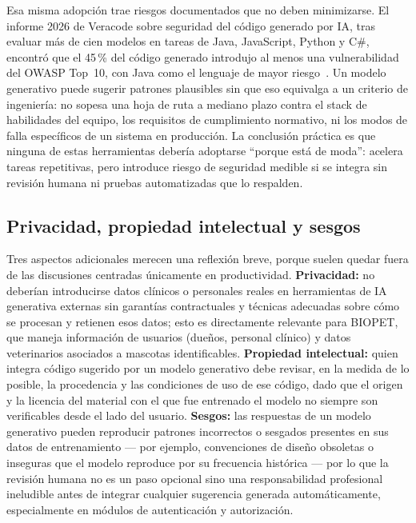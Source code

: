 Esa misma adopci\'on trae riesgos documentados que no deben minimizarse. El
informe 2026 de Veracode sobre seguridad del c\'odigo generado por IA, tras
evaluar m\'as de cien modelos en tareas de Java, JavaScript, Python y C\#,
encontr\'o que el 45\,\% del c\'odigo generado introdujo al menos una
vulnerabilidad del OWASP Top~10, con Java como el lenguaje de mayor
riesgo~\parencite{veracode-genai-2026}. Un modelo generativo puede sugerir
patrones plausibles sin que eso equivalga a un criterio de ingenier\'ia: no
sopesa una hoja de ruta a mediano plazo contra el stack de habilidades del
equipo, los requisitos de cumplimiento normativo, ni los modos de falla
espec\'ificos de un sistema en producci\'on. La conclusi\'on pr\'actica es
que ninguna de estas herramientas deber\'ia adoptarse ``porque est\'a de
moda'': acelera tareas repetitivas, pero introduce riesgo de seguridad
medible si se integra sin revisi\'on humana ni pruebas automatizadas que lo
respalden.

\subsection{Privacidad, propiedad intelectual y sesgos}
\label{sec:ia-privacidad-pi-sesgos}

Tres aspectos adicionales merecen una reflexi\'on breve, porque suelen quedar
fuera de las discusiones centradas \'unicamente en productividad.
\textbf{Privacidad:} no deber\'ian introducirse datos cl\'inicos o personales
reales en herramientas de IA generativa externas sin garant\'ias
contractuales y t\'ecnicas adecuadas sobre c\'omo se procesan y retienen esos
datos; esto es directamente relevante para BIOPET, que maneja informaci\'on
de usuarios (due\~nos, personal cl\'inico) y datos veterinarios asociados a
mascotas identificables. \textbf{Propiedad intelectual:} quien integra
c\'odigo sugerido por un modelo generativo debe revisar, en la medida de lo
posible, la procedencia y las condiciones de uso de ese c\'odigo, dado que el
origen y la licencia del material con el que fue entrenado el modelo no
siempre son verificables desde el lado del usuario. \textbf{Sesgos:} las
respuestas de un modelo generativo pueden reproducir patrones incorrectos o
sesgados presentes en sus datos de entrenamiento --- por ejemplo,
convenciones de dise\~no obsoletas o inseguras que el modelo reproduce por su
frecuencia hist\'orica --- por lo que la revisi\'on humana no es un paso
opcional sino una responsabilidad profesional ineludible antes de integrar
cualquier sugerencia generada autom\'aticamente, especialmente en m\'odulos
de autenticaci\'on y autorizaci\'on.

